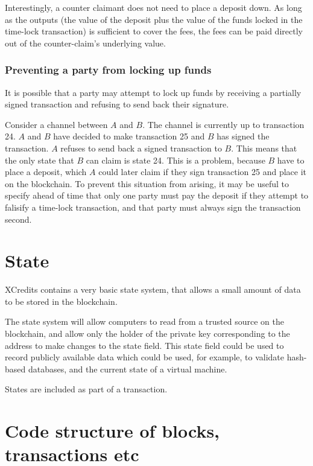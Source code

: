 \documentclass[a4paper,12pt]{article}
\begin{document}
Interestingly, a counter claimant does not need to place a deposit down. As long as the outputs (the value of the deposit plus the value of the funds locked in the time-lock transaction) is sufficient to cover the fees, the fees can be paid directly out of the counter-claim's underlying value. 


\subsubsection{Preventing a party from locking up funds}
It is possible that a party may attempt to lock up funds by receiving a partially signed transaction and refusing to send back their signature. 

Consider a channel between $A$ and $B$. The channel is currently up to transaction 24. $A$ and $B$ have decided to make transaction 25 and $B$ has signed the transaction. $A$ refuses to send back a signed transaction to $B$. This means that the only state that $B$ can claim is state 24. This is a problem, because $B$ have to place a deposit, which $A$ could later claim if they sign transaction 25 and place it on the blockchain. To prevent this situation from arising, it may be useful to specify ahead of time that only one party must pay the deposit if they attempt to falisify a time-lock transaction, and that party must always sign the transaction second. 





\section{State}
XCredits contains a very basic state system, that allows a small amount of data to be stored in the blockchain.

The state system will allow computers to read from a trusted source on the blockchain, and allow only the holder of the private key corresponding to the address to make changes to the state field. This state field could be used to record publicly available data which could be used, for example, to validate hash-based databases, and the current state of a virtual machine. 

States are included as part of a transaction.


\section{Code structure of blocks, transactions etc}
\end{document}
